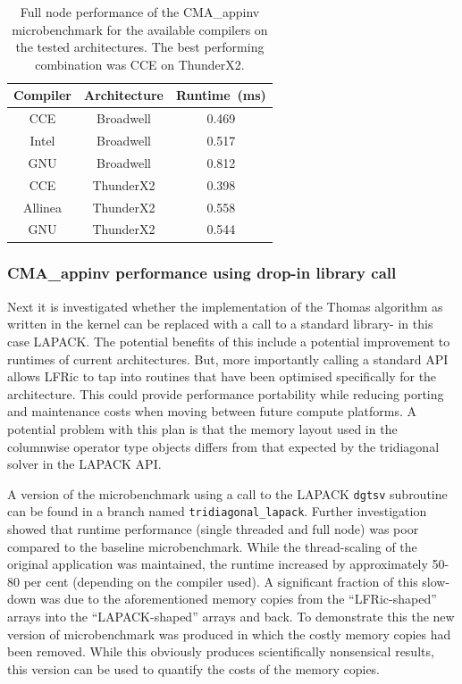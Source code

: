 \begin{table}[bh]
  \scriptsize
  \begin{center}
    \caption{Full node performance of the CMA\_appinv microbenchmark for the available compilers on the tested architectures.
      The best performing combination was CCE on ThunderX2.}
    \label{tab:cma_table}
     \begin{tabular}{|c|c|c|}
      \textbf{Compiler} & \textbf{Architecture} & \textbf{Runtime~(ms)} \\
      \hline
      CCE & Broadwell & 0.469 \\
      Intel & Broadwell & 0.517 \\
      GNU & Broadwell & 0.812 \\
      CCE & ThunderX2 & 0.398 \\
      Allinea & ThunderX2 & 0.558 \\
      GNU & ThunderX2 & 0.544 \\
    \end{tabular}
  \end{center}
\end{table}



\subsubsection{CMA\_appinv performance using drop-in library call}
Next it is investigated whether the implementation of the Thomas algorithm as written in the kernel can be replaced with a call to a standard library- in this case LAPACK.
The potential benefits of this include a potential improvement to runtimes of current architectures.
But, more importantly calling a standard API allows LFRic to tap into routines that have been optimised specifically for the architecture.
This could provide performance portability while reducing porting and maintenance costs when moving between future compute platforms.
A potential problem with this plan is that the memory layout used in the columnwise operator type objects differs from that expected by the tridiagonal solver in the LAPACK API.

A version of the microbenchmark using a call to the LAPACK \verb+dgtsv+ subroutine can be found in a branch named \verb+tridiagonal_lapack+.
Further investigation showed that runtime performance (single threaded and full node) was poor compared to the baseline microbenchmark.
While the thread-scaling of the original application was maintained, the runtime increased by approximately 50-80 per cent (depending on the compiler used).
A significant fraction of this slow-down was due to the aforementioned memory copies from the ``LFRic-shaped'' arrays into the ``LAPACK-shaped'' arrays and back.
To demonstrate this the new version of microbenchmark was produced in which the costly memory copies had been removed.
While this obviously produces scientifically nonsensical results, this version can be used to quantify the costs of the memory copies.

